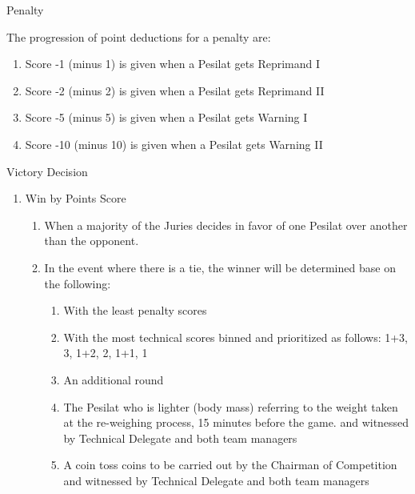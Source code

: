 \begin{legal}
\begin{legal}
\begin{legal}
            \item Penalty

            The progression of point deductions for a penalty are:
                \begin{enumerate}[label*=\arabic*.]
                \item Score -1 (minus 1) is given when a Pesilat gets Reprimand I
                \item Score -2 (minus 2) is given when a Pesilat gets Reprimand II
                \item Score -5 (minus 5) is given when a Pesilat gets Warning I
                \item Score -10 (minus 10) is given when a Pesilat gets Warning II
                \end{enumerate}


            \item Victory Decision \label{pt:victory_decision}
                \begin{enumerate}[label=\alph*.]
                \item Win by Points Score
                    \begin{enumerate}[label*=\arabic*.]
                    \item When a majority of the Juries decides in favor of one Pesilat over another
                        than the opponent.
                    \item In the event where there is a tie, the winner will be determined base on the 
                        following:
                        \begin{enumerate}[label=\roman*.]
                        \item With the least penalty scores
                        \item With the most technical scores binned and prioritized as follows: 
                            1+3, 3, 1+2, 2, 1+1, 1
                        \item An additional round
                        \item \label{pt:tanding_tie_weight} The Pesilat who is lighter (body mass) referring to the weight taken at the re-weighing process, 15 minutes before the game.  and witnessed by Technical Delegate and both team managers
                        \item \label{pt:tanding_tie_coin} A coin toss coins to be carried out by the Chairman of Competition and witnessed by Technical Delegate and both team managers
                        \end{enumerate}


\end{enumerate}
\end{enumerate}
\end{legal}
\end{legal}
\end{legal}
